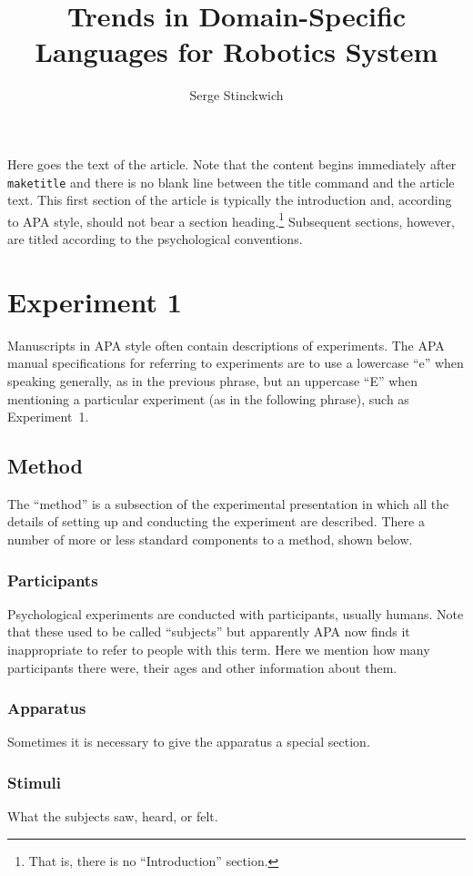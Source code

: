 \documentclass[man]{apa}
\title{Trends in Domain-Specific Languages for Robotics System}
\author{Serge Stinckwich}
\affiliation{UMMISCO, UMI 209\\IRD/IFI/Vietnam National University}
\begin{document}
\maketitle                            
Here goes the text of the article. Note that the content begins immediately after \texttt{maketitle} and there is no blank line between the title command and the article text. This first section of the article is typically the introduction and, according to APA style, should not bear a section heading.\footnote{That is, there is no ``Introduction'' section.} Subsequent sections, however, are titled according to the psychological conventions.

\section{Experiment 1} 
Manuscripts in APA style often contain descriptions of experiments.  The APA manual specifications for referring to experiments are to use a lowercase ``e'' when speaking generally, as in the previous phrase, but an uppercase ``E'' when mentioning a particular experiment (as in the following phrase), such as Experiment~1.

\subsection{Method}
The ``method'' is a subsection of the experimental presentation in which all the details of setting up and conducting the experiment are described.  There a number of more or less standard components to a method, shown below.
\subsubsection{Participants}
Psychological experiments are conducted with participants, usually humans. Note that these used to be called ``subjects'' but apparently APA now finds it inappropriate to refer to people with this term.  Here we mention how many participants there were, their ages and other information about them.
\subsubsection{Apparatus}
Sometimes it is necessary to give the apparatus a special section.
\subsubsection{Stimuli}
What the subjects saw, heard, or felt.
\end{document}
